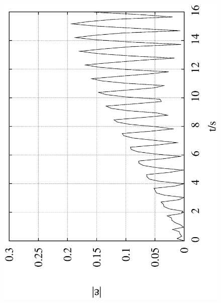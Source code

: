 \documentclass[10pt,a4paper]{article}
\begin{document}
\begin{figure}[h!]
\begin{center}
\includegraphics[scale = 0.3, angle =-90]{./Leapfrog_0.5_100000_0.txtSmall.eps}

\end{center}
\end{figure}
\end{document}
